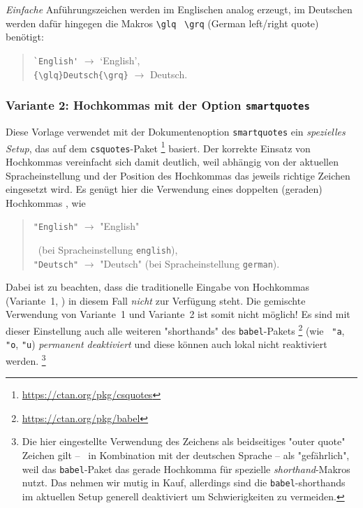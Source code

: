 \emph{Einfache} Anführungszeichen werden im Englischen analog erzeugt,
im Deutschen werden dafür hingegen die Makros \verb!\glq! \bzw\ \verb!\grq!
(German left/right quote) benötigt:
%
\begin{quote}
    \verb!`English'! $\rightarrow$ `English',\\
    \verb!{\glq}Deutsch{\grq}! $\rightarrow$ {\glq}Deutsch{\grq}.
\end{quote}

\subsubsection{Variante 2: Hochkommas mit der Option \texttt{smartquotes}}

Diese Vorlage verwendet mit der Dokumentenoption \texttt{smartquotes}
ein \emph{spezielles Setup}, das auf dem \texttt{csquotes}-Paket%
\footnote{\url{https://ctan.org/pkg/csquotes}}
basiert. Der korrekte Einsatz von Hochkommas vereinfacht sich damit deutlich,
weil abhängig von der aktuellen Spracheinstellung und der Position des
Hochkommas das jeweils richtige Zeichen eingesetzt wird. Es genügt hier die
Verwendung eines doppelten (geraden) Hochkommas \texttt{\textquotedbl}, wie \zB
%
\begin{quote}
    \begin{english}
        \verb!"English"! $\rightarrow$ "English"
    \end{english}\ (bei Spracheinstellung \texttt{english}),\\
    \verb!"Deutsch"! $\rightarrow$ "Deutsch" (bei Spracheinstellung
    \texttt{german}).
\end{quote}
%
Dabei ist zu beachten, dass die traditionelle Eingabe von Hochkommas
(Variante~1, \so) in diesem Fall \emph{nicht} zur Verfügung steht. Die
gemischte Verwendung von Variante~1 und Variante~2 ist somit nicht möglich!
Es sind mit dieser Einstellung auch alle weiteren "shorthands" des
\texttt{babel}-Pakets%
\footnote{\url{https://ctan.org/pkg/babel}}
(wie \zB\ \verb!"a!, \verb!"o!, \verb!"u!) \emph{permanent deaktiviert} und
diese können auch lokal nicht reaktiviert werden.%
\footnote{Die hier eingestellte Verwendung des \texttt{\textquotedbl}
Zeichens als beidseitiges "outer quote" Zeichen gilt -- \va\ in Kombination
mit der deutschen Sprache -- als "gefährlich", weil das \texttt{babel}-Paket
das gerade Hochkomma für spezielle \emph{shorthand}-Makros nutzt. Das nehmen
wir mutig in Kauf, allerdings sind die \texttt{babel}-shorthands im aktuellen
Setup generell deaktiviert um Schwierigkeiten zu vermeiden.}


